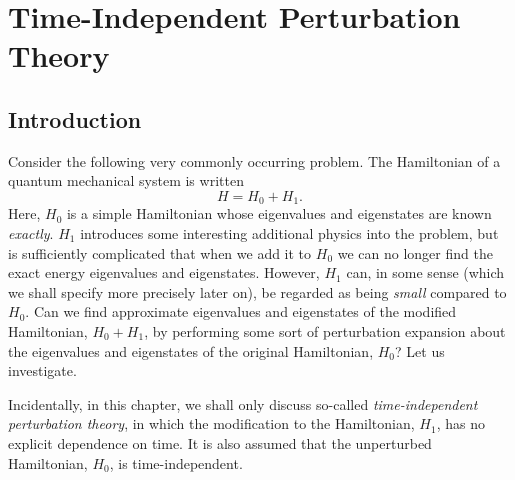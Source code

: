 \chapter{Time-Independent Perturbation Theory}\label{stimin}
\section{Introduction}
Consider the following very commonly occurring problem. The Hamiltonian of a
quantum mechanical system is written
\begin{equation}
H = H_0 + H_1.
\end{equation} 
Here, $H_0$ is a simple Hamiltonian whose eigenvalues and eigenstates
are known {\em exactly}. $H_1$ introduces some interesting additional 
physics into the problem, but is sufficiently complicated that when
we add it to $H_0$ we can no longer find the exact energy eigenvalues
and eigenstates. However, $H_1$ can, in some sense (which we shall
specify more precisely later on), be regarded as being {\em small}\/ compared
to $H_0$. Can we find approximate eigenvalues and eigenstates
of the modified Hamiltonian, $H_0+H_1$, by performing some
sort of perturbation expansion about the eigenvalues and eigenstates of the original
Hamiltonian, $H_0$? Let us investigate.

Incidentally, in this chapter, we shall only discuss so-called {\em time-independent
perturbation theory}, in which the modification to the Hamiltonian,
$H_1$, has no explicit dependence on time. It is also assumed
that the unperturbed Hamiltonian, $H_0$, is time-independent.

